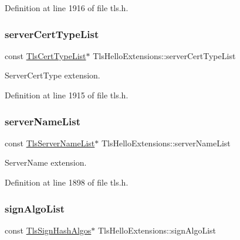 Definition at line 1916 of file tls.\+h.

\mbox{\label{structTlsHelloExtensions_a7e4a609ad6013ea6bcab97286320cf16}} 
\subsubsection{\texorpdfstring{server\+Cert\+Type\+List}{serverCertTypeList}}
{\footnotesize\ttfamily const \hyperlink{tls_8h_aef3d0205a40e8c95b8d7019053d3e7ca}{Tls\+Cert\+Type\+List}$\ast$ Tls\+Hello\+Extensions\+::server\+Cert\+Type\+List}



Server\+Cert\+Type extension. 



Definition at line 1915 of file tls.\+h.

\mbox{\label{structTlsHelloExtensions_a53acaa1dcce86449741ea9a780331d46}} 
\subsubsection{\texorpdfstring{server\+Name\+List}{serverNameList}}
{\footnotesize\ttfamily const \hyperlink{tls_8h_a15e86cf6f06b8178e14735d6e4c83cb1}{Tls\+Server\+Name\+List}$\ast$ Tls\+Hello\+Extensions\+::server\+Name\+List}



Server\+Name extension. 



Definition at line 1898 of file tls.\+h.

\mbox{\label{structTlsHelloExtensions_a7903ad9cf319d5f27990432c4e719544}} 
\subsubsection{\texorpdfstring{sign\+Algo\+List}{signAlgoList}}
{\footnotesize\ttfamily const \hyperlink{tls_8h_a52f8ea223987ee1e857b6687f38d3888}{Tls\+Sign\+Hash\+Algos}$\ast$ Tls\+Hello\+Extensions\+::sign\+Algo\+List}



